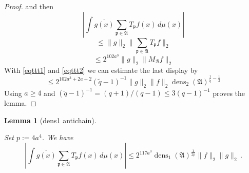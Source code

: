 \documentclass[10pt,a4paper]{article}
\theoremstyle{plain}
\newtheorem{lemma}[theorem]{Lemma}
\theoremstyle{definition}
\numberwithin{equation}{subsection}
\DeclareMathOperator{\dens}{\operatorname{dens}}
\newcommand{\fp}{{\mathfrak p}}
\newcommand{\lean}[1]{}
\newcommand{\uses}[1]{}
\newcommand{\leanok}{}
\begin{document}
\begin{proof}
and then 
 \begin{equation}
     |\int \overline{g(x)} \sum_{\fp \in \mathfrak{A}} T_{\fp} f(x)\, d\mu(x)|
\end{equation}
 \begin{equation}
     \le \|g\|_2 \Big\| \sum_{\fp \in \mathfrak{A}} T_{\fp} f \Big\|_2
\end{equation}
 \begin{equation}
     \le 2^{102a^3}\|g\|_2 \| M_{\mathcal{B}}f \|_2
\end{equation}
With \eqref{eqttt1} and
\eqref{eqttt2} we can estimate the last display by
\begin{equation}
    \le 2^{102a^3+2a+2}(\tilde{q}-1)^{-1} \|g\|_2 \|f\|_2\dens_2(\mathfrak{A})^{\frac 1{\tilde{q}}-\frac 12}
\end{equation}
Using $a\ge 4$ and
$(\tilde q - 1)^{-1} = (q+1)/(q-1) \le 3(q-1)^{-1}$
proves the lemma.
\end{proof}


\begin{lemma}[dens1 antichain]\label{dens1-antichain}
    \leanok
    \lean{dens1_antichain}
    \uses{Hardy-Littlewood, tile-correlation,antichain-tile-count}
Set $p:=4a^4$. We have
    \begin{equation}\label{eqttt3}
  \left|\int \overline{g(x)} \sum_{\fp \in \mathfrak{A}} T_{\fp} f(x)\, d\mu(x)\right|\le
   2^{117a^3}\dens_1(\mathfrak{A})^{\frac 1{2p}} \|f\|_2\|g\|_2\,.
\end{equation}
\end{lemma}
\end{document}

